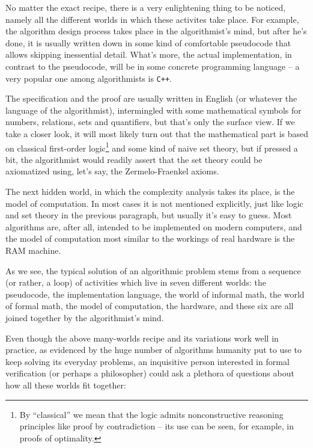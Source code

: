 \documentclass[declaration,mgr,english,shortabstract]{iithesis}
\newcommand{\m}[1]{\texttt{#1}}
\begin{document}
No matter the exact recipe, there is a very enlightening thing to be noticed, namely all the different worlds in which these activites take place. For example, the algorithm design process takes place in the algorithmist's mind, but after he's done, it is usually written down in some kind of comfortable pseudocode that allows skipping inessential detail. What's more, the actual implementation, in contrast to the pseudocode, will be in some concrete programming language -- a very  popular one among algorithmists is \m{C++}.

The specification and the proof are usually written in English (or whatever the language of the algorithmist), intermingled with some mathematical symbols for numbers, relations, sets and quantifiers, but that's only the surface view. If we take a closer look, it will most likely turn out that the mathematical part is based on classical first-order logic\footnote{By ``classical'' we mean that the logic admits nonconstructive reasoning principles like proof by contradiction \cite{ProofByContradiction} -- its use can be seen, for example, in proofs of optimality.} and some kind of naive set theory, but if pressed a bit, the algorithmist would readily assert that the set theory could be axiomatized using, let's say, the Zermelo-Fraenkel axioms.

The next hidden world, in which the complexity analysis takes its place, is the model of computation. In most cases it is not mentioned explicitly, just like logic and set theory in the previous paragraph, but usually it's easy to guess. Most algorithms are, after all, intended to be implemented on modern computers, and the model of computation most similar to the workings of real hardware is the RAM machine.

As we see, the typical solution of an algorithmic problem stems from a sequence (or rather, a loop) of activities which live in seven different worlds: the pseudocode, the implementation language, the world of informal math, the world of formal math, the model of computation, the hardware, and these six are all joined together by the algorithmist's mind.

Even though the above many-worlds recipe and its variations work well in practice, as evidenced by the huge number of algorithms humanity put to use to keep solving its everyday problems, an inquisitive person interested in formal verification (or perhaps a philosopher) could ask a plethora of questions about how all these worlds fit together:
\end{document}
